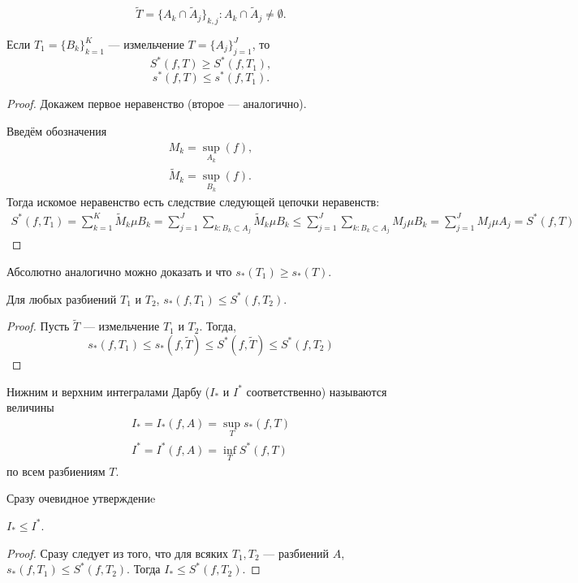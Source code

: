 $$
    \widetilde{T} =  \{A_k \cap \widetilde{A}_j\}_{k, j}:  A_k \cap \widetilde{A}_j \neq \emptyset.
$$
\begin{Lemma}
    Если $T_1 = \{B_k\}_{k=1}^{K}$ --- измельчение $T = \{A_j\}_{j =1}^{J}$, то 
    $$
        S^* (f, T) \geqslant S^*(f, T_1),
    $$
    $$
    s^* (f, T) \leqslant s^*(f, T_1).
    $$
\end{Lemma}
\begin{proof}
    Докажем первое неравенство (второе --- аналогично).
    
    Введём обозначения
    \begin{gather}
        M_k = \sup_{A_k}(f),\\
        \widetilde{M}_k = \sup_{B_k}(f).
    \end{gather}
    Тогда искомое неравенство есть следствие следующей цепочки неравенств:
    \begin{gather}
        S^*(f, T_1) = \sum\limits_{k = 1}^{K}\widetilde{M}_k\mu B_k =  \sum\limits_{j = 1}^{J} \sum\limits_{k\colon B_k \subset A_j} \widetilde{M}_k \mu B_k \leqslant \sum\limits_{j=1}^J  \sum\limits_{k\colon B_k \subset A_j} M_j \mu B_k = \sum\limits_{j=1}^J M_j \mu A_j = S^*(f, T)
    \end{gather}
\end{proof}
Абсолютно аналогично можно доказать и что $s_*(T_1) \geqslant s_*(T)$.
\begin{Statement}
    Для любых разбиений $T_1$ и $T_2$, $s_*(f, T_1) \leqslant S^*(f, T_2)$.
\end{Statement}
\begin{proof}
    Пусть $\widetilde{T}$ --- измельчение $T_1$ и $T_2$. Тогда,
    $$
        s_*(f, T_1) \leqslant s_*(f, \widetilde{T}) \leqslant S^*(f, \widetilde{T}) \leqslant S^*(f, T_2)
    $$
\end{proof}
\begin{Def}
    Нижним и верхним интегралами Дарбу ($I_*$ и $I^*$ соответственно) называются величины
    \begin{gather}
        I_* = I_*(f, A) = \sup_{T} s_*(f,T)\\
        I^* = I^*(f, A) = \inf_{T} S^*(f, T)
    \end{gather}
    по всем разбиениям $T$.
\end{Def}
Сразу очевидное утверждениe
\begin{Statement}
    $I_* \leqslant I^*$.
\end{Statement}
\begin{proof}
    Сразу следует из того, что для всяких $T_1, T_2$ --- разбиений $A$, $s_*(f, T_1) \leqslant S^*(f, T_2)$. Тогда $I_* \leqslant S^*(f, T_2)$.
\end{proof}
